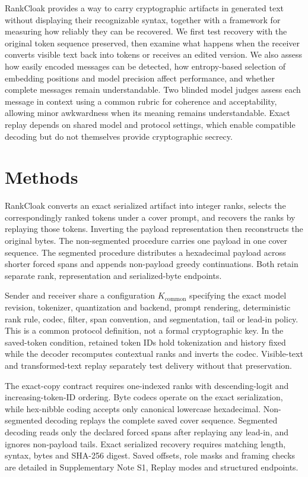 \documentclass[fleqn,10pt]{wlscirep}
\begin{document}
RankCloak provides a way to carry cryptographic artifacts in generated text without displaying their recognizable syntax, together with a framework for measuring how reliably they can be recovered. We first test recovery with the original token sequence preserved, then examine what happens when the receiver converts visible text back into tokens or receives an edited version. We also assess how easily encoded messages can be detected, how entropy-based selection of embedding positions and model precision affect performance, and whether complete messages remain understandable. Two blinded model judges assess each message in context using a common rubric for coherence and acceptability, allowing minor awkwardness when its meaning remains understandable. Exact replay depends on shared model and protocol settings, which enable compatible decoding but do not themselves provide cryptographic secrecy.

\section*{Methods}\label{sec:methods}

RankCloak converts an exact serialized artifact into integer ranks, selects the correspondingly ranked tokens under a cover prompt, and recovers the ranks by replaying those tokens. Inverting the payload representation then reconstructs the original bytes. The non-segmented procedure carries one payload in one cover sequence. The segmented procedure distributes a hexadecimal payload across shorter forced spans and appends non-payload greedy continuations. Both retain separate rank, representation and serialized-byte endpoints.

Sender and receiver share a configuration \(K_{\mathrm{common}}\) specifying the exact model revision, tokenizer, quantization and backend, prompt rendering, deterministic rank rule, codec, filter, span convention, and segmentation, tail or lead-in policy. This is a common protocol definition, not a formal cryptographic key. In the saved-token condition, retained token IDs hold tokenization and history fixed while the decoder recomputes contextual ranks and inverts the codec. Visible-text and transformed-text replay separately test delivery without that preservation.

The exact-copy contract requires one-indexed ranks with descending-logit and increasing-token-ID ordering. Byte codecs operate on the exact serialization, while hex-nibble coding accepts only canonical lowercase hexadecimal. Non-segmented decoding replays the complete saved cover sequence. Segmented decoding reads only the declared forced spans after replaying any lead-in, and ignores non-payload tails. Exact serialized recovery requires matching length, syntax, bytes and SHA-256 digest. Saved offsets, role masks and framing checks are detailed in Supplementary Note S1, Replay modes and structured endpoints.
\end{document}
